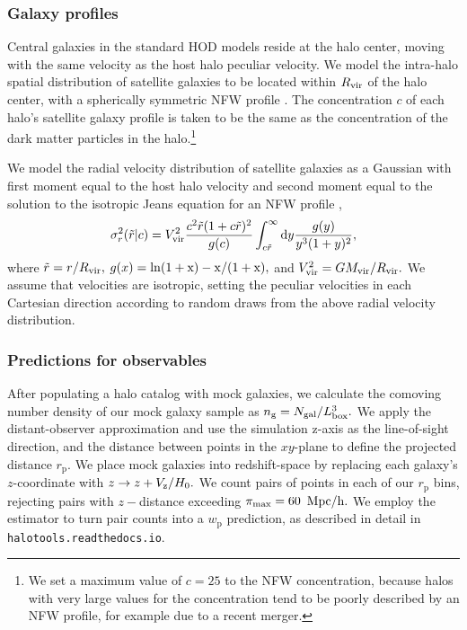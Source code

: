 \documentclass[usenatbib,usegraphicx,letterpaper]{mn2e}
\newcommand{\mvir}{M_{\rm vir}}
\newcommand{\rvir}{R_{\rm vir}}
\newcommand{\wprp}{w_{\mathrm{p}}}
\newcommand{\rp}{r_{\mathrm{p}}}
\begin{document}
\subsubsection{Galaxy profiles}

Central galaxies in the standard HOD models reside at the halo center,
moving with the same velocity as the host halo peculiar velocity. We
model the intra-halo spatial distribution of satellite galaxies to be
located within $\rvir$ of the halo center, with a spherically
symmetric NFW profile \citep{nfw97}.  The concentration $c$ of each
halo's satellite galaxy profile is taken to be the same as the
concentration of the dark matter particles in the halo.\footnote{We
  set a maximum value of $c=25$ to the NFW concentration, because
  halos with very large values for the concentration tend to be poorly
  described by an NFW profile, for example due to a recent merger.}


We model the radial velocity distribution of satellite galaxies as a
Gaussian with first moment equal to the host halo velocity and second
moment equal to the solution to the isotropic Jeans equation for an
NFW profile \citep{more09b},
\begin{equation}
\sigma^{2}_{r}(\tilde{r}|c) = V_{\rm vir}^{2}\frac{c^{2}\tilde{r}(1 + c\tilde{r})^{2}}{g(c)}\int_{c\tilde{r}}^{\infty}{\rm d}y\frac{g(y)}{y^{3}(1 + y)^{2}}, 
\end{equation}
where $\tilde{r} = r/\rvir,$ $g(x) = \rm{ln}(1+x) - x / (1+x),$ and
$V_{\rm vir}^{2} = G\mvir/\rvir.$ We assume that velocities are
isotropic, setting the peculiar velocities in each Cartesian direction
according to random draws from the above radial velocity distribution.

\subsubsection{Predictions for observables}

After populating a halo catalog with mock galaxies, we calculate the
comoving number density of our mock galaxy sample as $n_{\rm g} =
N_{\rm gal} / L_{\rm box}^3.$ We apply the distant-observer
approximation and use the simulation z-axis as the line-of-sight
direction, and the distance between points in the $xy$-plane to define
the projected distance $\rp.$ We place mock galaxies into
redshift-space by replacing each galaxy's $z$-coordinate with $z
\rightarrow z + V_{\rm z}/H_0.$ We count pairs of points in each of
our $\rp$ bins, rejecting pairs with $z-$distance exceeding $\pi_{\rm
  max}=60$ ${\rm Mpc/h.}$ We employ the \citet{landyszalay93}
estimator to turn pair counts into a $\wprp$ prediction, as described
in detail in {\tt halotools.readthedocs.io}.
\end{document}
